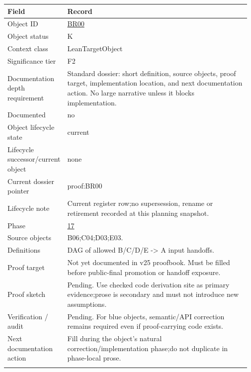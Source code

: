 \begin{longtable}{L{0.16\linewidth} L{0.81\linewidth}}
\hline
\textbf{Field} & \textbf{Record}\\
\hline
Object ID & \hyperlink{object-row-BR00}{BR00}\\
\hline\addlinespace[0.20em]
Object status & K\\
\hline\addlinespace[0.20em]
Context class & LeanTargetObject\\
\hline\addlinespace[0.20em]
Significance tier & F2\\
\hline\addlinespace[0.20em]
Documentation depth requirement & Standard dossier: short definition, source objects, proof target, implementation location, and next documentation action. No large narrative unless it blocks implementation.\\
\hline\addlinespace[0.20em]
Documented & no\\
\hline\addlinespace[0.20em]
Object lifecycle state & current\\
\hline\addlinespace[0.20em]
Lifecycle successor/\allowbreak{}current object & none\\
\hline\addlinespace[0.20em]
Current dossier pointer & proof:BR00\\
\hline\addlinespace[0.20em]
Lifecycle note & Current register row;\newline no supersession, rename or retirement recorded at this planning snapshot.\\
\hline\addlinespace[0.20em]
Phase & \hyperlink{phase-row-17}{17}\\
\hline\addlinespace[0.20em]
Source objects & B06;\newline C04;\newline D03;\newline E03.\\
\hline\addlinespace[0.20em]
Definitions & DAG of allowed B/\allowbreak{}C/\allowbreak{}D/\allowbreak{}E -> A input handoffs.\\
\hline\addlinespace[0.20em]
Proof target & Not yet documented in v25 proofbook. Must be filled before public-final promotion or handoff exposure.\\
\hline\addlinespace[0.20em]
Proof sketch & Pending. Use checked code derivation site as primary evidence;\newline prose is secondary and must not introduce new assumptions.\\
\hline\addlinespace[0.20em]
Verification /\allowbreak{} audit & Pending. For blue objects, semantic/\allowbreak{}API correction remains required even if proof-carrying code exists.\\
\hline\addlinespace[0.20em]
Next documentation action & Fill during the object's natural correction/\allowbreak{}implementation phase;\newline do not duplicate in phase-local prose.\\
\hline\addlinespace[0.20em]
\end{longtable}
